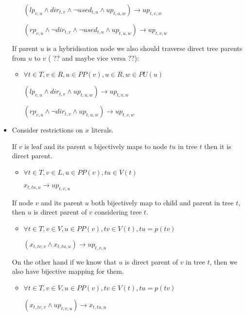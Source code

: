 \documentclass[runningheads, envcountsame, a4paper]{llncs}
\begin{document}
\begin{itemize}
\begin{itemize}
    $(lp_{v,u} \wedge dir_{t,v} \wedge \neg used_{t,u} \wedge up_{t,u,w}) \rightarrow up_{t,v,w}$

    $(rp_{v,u} \wedge \neg dir_{t,v} \wedge \neg used_{t,u} \wedge up_{t,u,w}) \rightarrow up_{t,v,w}$
	\end {itemize}
	
	If parent $u$ is a hybridisation node we also should traverse direct tree parents from $u$ to $v$ ( ?? and maybe vice versa ??):
	
    \begin{itemize}
    \item $\forall t \in T, v \in R, u \in PP(v), u \in R, w \in PU(u)$
	
    $(lp_{v,u} \wedge dir_{t,v} \wedge up_{t,u,w}) \rightarrow up_{t,v,w}$

    $(rp_{v,u} \wedge \neg dir_{t,v} \wedge up_{t,u,w}) \rightarrow up_{t,v,w}$
	\end {itemize}

\item Consider restrictions on $x$ literals.

	If $v$ is leaf and its parent $u$ bijectively maps to node $tu$ in tree $t$ then it is direct parent.	    

	\begin{itemize}
    \item $\forall t \in T, v \in L, u \in PP(v), tu \in V(t)$

	$x_{t,tu,u} \rightarrow up_{t,v,u}$
	\end {itemize}
	
	If node $v$ and its parent $u$ both bijectively map to child and parent in tree $t$, then $u$ is direct 
	parent of $v$ considering tree $t$.

	\begin{itemize}
    \item $\forall t \in T, v \in V, u \in PP(v), tv \in V(t), tu = p(tv)$

	$(x_{t,tv,v} \wedge x_{t,tu,u}) \rightarrow up_{t,v,u}$
	\end {itemize}
	
	On the other hand if we know that $u$ is direct parent of $v$ in tree $t$, then we also have bijective mapping for them.

	\begin{itemize}
    \item $\forall t \in T, v \in V, u \in PP(v), tv \in V(t), tu = p(tv)$

	$(x_{t,tv,v} \wedge up_{t,v,u}) \rightarrow x_{t,tu,u}$
	\end {itemize}
	

\end{itemize}
\end{document}

